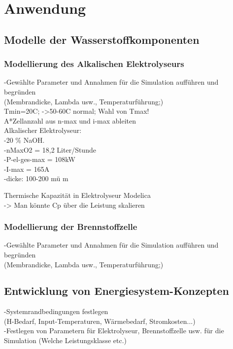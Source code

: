 \chapter{Anwendung}
\label{cha:Anwendung}

\section{Modelle der Wasserstoffkomponenten}

\subsection{Modellierung des Alkalischen Elektrolyseurs}
-Gewählte Parameter und Annahmen für die Simulation aufführen und begründen\\
(Membrandicke, Lambda usw., Temperaturführung;)\\
Tmin=20C; ->50-60C normal; Wahl von Tmax!\\
A*Zellanzahl aus n-max und i-max ableiten\\

Alkalischer Elektrolyseur:\\
-20 \% NaOH.\\
-nMaxO2 = 18,2 Liter/Stunde\\
-P-el-ges-max = 108kW\\
-I-max = 165A\\
-dicke: 100-200 mü m \cite{rashid - Hydrogen Production by Water Electrolysis: A
Review of Alkaline Water Electrolysis, PEM Water
Electrolysis and High Temperature Water
Electrolysis}


Thermische Kapazität in Elektrolyseur Modelica\\
-> Man könnte Cp über die Leistung skalieren\\ 



\subsection{Modellierung der Brennstoffzelle}
-Gewählte Parameter und Annahmen für die Simulation aufführen und begründen\\
(Membrandicke, Lambda usw., Temperaturführung;)\\

\section{Entwicklung von Energiesystem-Konzepten}
-Systemrandbedingungen festlegen\\
(H-Bedarf, Input-Temperaturen, Wärmebedarf, Stromkosten...)\\
-Festlegen von Parametern für Elektrolyseur, Brennstoffzelle usw. für die Simulation (Welche Leistungsklasse etc.)\\

